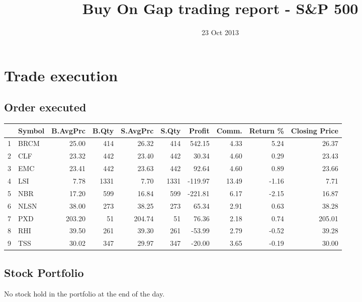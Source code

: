 \documentclass{tufte-handout}\usepackage[]{graphicx}\usepackage[]{color}
\title{Buy On Gap trading report - S\&P 500}
\date{ 23 Oct 2013 }
\begin{document}
\maketitle


\section{Trade execution}
\subsection{Order executed}

\begin{table}[ht]
\centering
\begin{tabular}{llrrrrrrr|r}
  \hline
 & Symbol & B.AvgPrc & B.Qty & S.AvgPrc & S.Qty & Profit & Comm. & Return \% & Closing Price \\ 
  \hline
1 & BRCM & 25.00 & 414 & 26.32 & 414 & 542.15 & 4.33 & 5.24 & 26.37 \\ 
  2 & CLF & 23.32 & 442 & 23.40 & 442 & 30.34 & 4.60 & 0.29 & 23.43 \\ 
  3 & EMC & 23.41 & 442 & 23.63 & 442 & 92.64 & 4.60 & 0.89 & 23.66 \\ 
  4 & LSI & 7.78 & 1331 & 7.70 & 1331 & -119.97 & 13.49 & -1.16 & 7.71 \\ 
  5 & NBR & 17.20 & 599 & 16.84 & 599 & -221.81 & 6.17 & -2.15 & 16.87 \\ 
  6 & NLSN & 38.00 & 273 & 38.25 & 273 & 65.34 & 2.91 & 0.63 & 38.28 \\ 
  7 & PXD & 203.20 &  51 & 204.74 &  51 & 76.36 & 2.18 & 0.74 & 205.01 \\ 
  8 & RHI & 39.50 & 261 & 39.30 & 261 & -53.99 & 2.79 & -0.52 & 39.28 \\ 
  9 & TSS & 30.02 & 347 & 29.97 & 347 & -20.00 & 3.65 & -0.19 & 30.00 \\ 
   \hline
\end{tabular}
\end{table}



\subsection{Stock Portfolio}
No stock hold in the portfolio at the end of the day.
\end{document}
